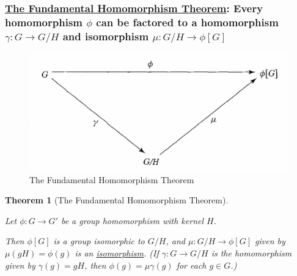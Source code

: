 \documentclass[11pt,a4paper]{article}
\newtheorem{theorem}{Theorem}
\begin{document}
\subsubsection{\underline{The Fundamental Homomorphism Theorem}: Every homomorphism $\phi$ can be factored to a homomorphism $\gamma: G \rightarrow G/H$ and isomorphism $\mu : G/H \rightarrow	\phi[G]$}
\begin{center}\begin{figure}[htbp]
    \centering
    \includegraphics[scale=0.5]{FHT.png}
    \caption{The Fundamental Homomorphism Theorem}
    \label{}
\end{figure}\end{center}
\begin{theorem}[The Fundamental Homomorphism Theorem]
    \quad
    \begin{center}
    \end{center}

    Let $\phi: G \rightarrow G'$ be a group
    homomorphism with kernel $H$.
    
    Then $\phi[G]$ is a group isomorphic to $G/H$, and $\mu: G/H \rightarrow \phi[G]$ given by $\mu(gH)=\phi(g)$ is an \underline{isomorphism}.
    (If $\gamma:G \rightarrow G/H$ is the homomorphism given by $\gamma(g) = gH$, then $\phi(g) = \mu\gamma(g)$ for each $g\in G$.)
\end{theorem}
\end{document}
